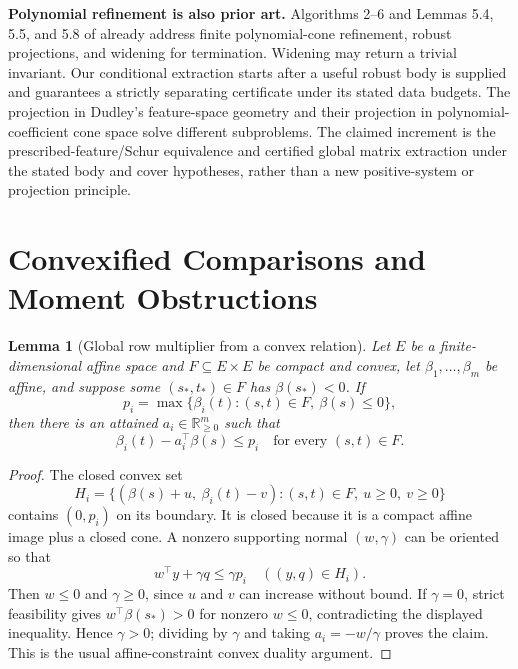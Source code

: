 \documentclass[journal,10pt]{IEEEtran}
\newtheorem{lemma}{Lemma}
\theoremstyle{definition}\newtheorem{definition}{Definition}
\theoremstyle{remark}
\newcommand{\R}{\mathbb R}
\begin{document}
\textbf{Polynomial refinement is also prior art.}
Algorithms 2--6 and Lemmas 5.4, 5.5, and 5.8 of \cite{cone2024} already address
finite polynomial-cone refinement, robust projections, and widening for
termination. Widening may return a trivial invariant.
Our conditional extraction starts after a useful robust body is supplied and
guarantees a strictly separating certificate under its stated data budgets.
The projection in Dudley's feature-space geometry and their projection in
polynomial-coefficient cone space solve different subproblems.
The claimed increment is the prescribed-feature/Schur equivalence and certified global matrix extraction under the stated body and cover hypotheses, rather than a new positive-system or projection principle.

\section{Convexified Comparisons and Moment Obstructions}\label{sec:moment}
\begin{lemma}[Global row multiplier from a convex relation]\label{lem:dual}
Let $E$ be a finite-dimensional affine space and $F\subseteq E\times E$ be compact and convex, let $\beta_1,\ldots,\beta_m$ be affine, and suppose some $(s_*,t_*)\in F$ has $\beta(s_*)<0$. If
\[
 p_i=\max\{\beta_i(t):(s,t)\in F,\ \beta(s)\leq0\},
\]
then there is an attained $a_i\in\R_{\geq0}^m$ such that
\[
 \beta_i(t)-a_i^\top\beta(s)\leq p_i\quad\text{for every }(s,t)\in F.
\]
\end{lemma}
\begin{proof}
The closed convex set
\[
 H_i=\{(\beta(s)+u,\ \beta_i(t)-v):(s,t)\in F,\ u\geq0,\ v\geq0\}
\]
contains $(0,p_i)$ on its boundary. It is closed because it is a compact affine image plus a closed cone. A nonzero supporting normal $(w,\gamma)$ can be oriented so that
\[
 w^\top y+\gamma q\leq\gamma p_i\quad((y,q)\in H_i).
\]
Then $w\leq0$ and $\gamma\geq0$, since $u$ and $v$ can increase without bound. If $\gamma=0$, strict feasibility gives $w^\top\beta(s_*)>0$ for nonzero $w\leq0$, contradicting the displayed inequality. Hence $\gamma>0$; dividing by $\gamma$ and taking $a_i=-w/\gamma$ proves the claim. This is the usual affine-constraint convex duality argument.
\end{proof}
\end{document}
